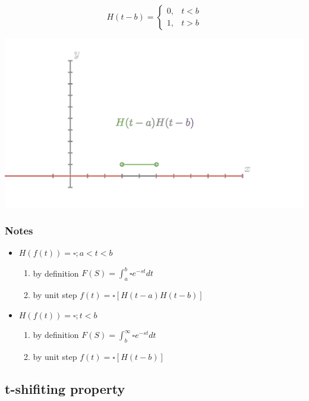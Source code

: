 \documentclass[11pt]{article}
\theoremstyle{definition}
\begin{document}
\[   
    H(t- b) = 
    \begin{cases}
        0, & \text{$t < b$} \\ 
        1, & \text{$t > b$}
    \end{cases}
\]

\begin{center}
    \includegraphics[scale=0.15]{result3.png}
\end{center}

\subsubsection{Notes}
\begin{itemize}
    \item $H(f(t)) = \square; a< t < b$ 
        \begin{enumerate}
            \item by definition $F(S) = \int_a^b\square e^{-st} dt$
            \item by unit step $f(t) = \square[H(t-a)H(t-b)]$   
        \end{enumerate}

    \item $H(f(t)) = \square; t < b$ 
        \begin{enumerate}
            \item by definition $F(S) = \int_b^\infty \square e^{-st} dt$
            \item by unit step $f(t) = \square[H(t-b)]$   
        \end{enumerate}
\end{itemize}

\subsection{t-shifiting property}
\end{document}
